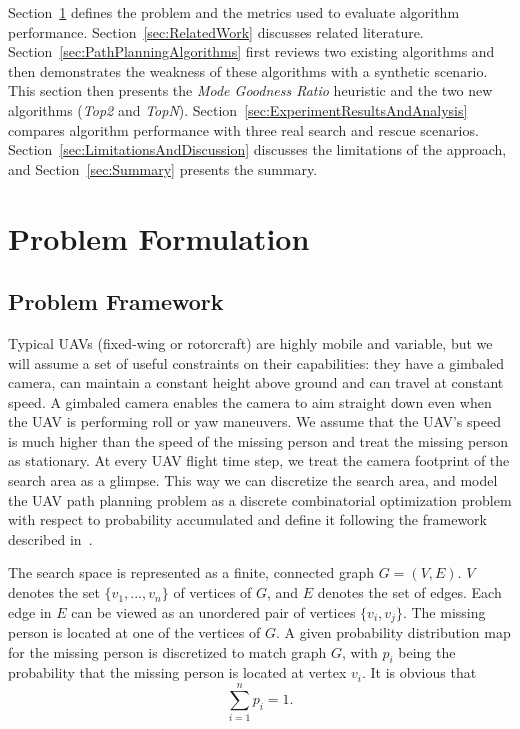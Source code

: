 \documentclass[journal]{IEEEtran}
\begin{document}
Section~\ref{sec:ProblemFormulation} defines the problem and the metrics used to evaluate algorithm performance. Section~\ref{sec:RelatedWork} discusses related literature. Section~\ref{sec:PathPlanningAlgorithms} first reviews two existing algorithms and then demonstrates the weakness of these algorithms with a synthetic scenario. This section then presents the \textit{Mode Goodness Ratio} heuristic and the two new algorithms (\textit{Top2} and \textit{TopN}). Section~\ref{sec:ExperimentResultsAndAnalysis} compares algorithm performance with three real search and rescue scenarios. Section~\ref{sec:LimitationsAndDiscussion} discusses the limitations of the approach, and Section~\ref{sec:Summary} presents the summary.


\section{Problem Formulation}
\label{sec:ProblemFormulation}

\subsection{Problem Framework}

Typical UAVs (fixed-wing or rotorcraft) are highly mobile and variable, but we will assume a set of useful constraints on their capabilities: they have a gimbaled camera, can maintain a constant height above ground and can travel at constant speed. A gimbaled camera enables the camera to aim straight down even when the UAV is performing roll or yaw maneuvers. We assume that the UAV's speed is much higher than the speed of the missing person and treat the missing person as stationary. At every UAV flight time step, we treat the camera footprint of the search area as a glimpse. This way we can discretize the search area, and model the UAV path planning problem as a discrete combinatorial optimization problem with respect to probability accumulated and define it following the framework described in~\cite{trummel1986technical}.

The search space is represented as a finite, connected graph $G = (V, E)$. $V$ denotes the set $\{v_1, ..., v_n\}$ of vertices of $G$, and $E$ denotes the set of edges. Each edge in $E$ can be viewed as an unordered pair of vertices $\{v_i, v_j\}$. The missing person is located at one of the vertices of $G$. A given probability distribution map for the missing person is discretized to match graph $G$, with $p_i$ being the probability that the missing person is located at vertex $v_i$. It is obvious that
\begin{equation}
\sum_{i=1}^{n}p_i = 1.
\label{totalP}
\end{equation}
\end{document}
